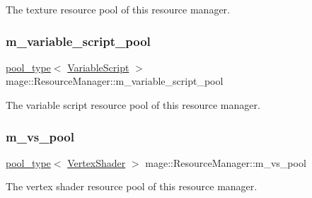 The texture resource pool of this resource manager. \hypertarget{classmage_1_1_resource_manager_a8f1826ab2392b60265afe5ba1ef2c4ed}{}\label{classmage_1_1_resource_manager_a8f1826ab2392b60265afe5ba1ef2c4ed} 
\subsubsection{\texorpdfstring{m\+\_\+variable\+\_\+script\+\_\+pool}{m\_variable\_script\_pool}}
{\footnotesize\ttfamily \hyperlink{classmage_1_1_resource_manager_a4416f0a710790d8aa2d0bc006764695a}{pool\+\_\+type}$<$ \hyperlink{classmage_1_1_variable_script}{Variable\+Script} $>$ mage\+::\+Resource\+Manager\+::m\+\_\+variable\+\_\+script\+\_\+pool\hspace{0.3cm}{\ttfamily [private]}}

The variable script resource pool of this resource manager. \hypertarget{classmage_1_1_resource_manager_ab8751a95e77af4000106e02bf8b4f8cb}{}\label{classmage_1_1_resource_manager_ab8751a95e77af4000106e02bf8b4f8cb} 
\subsubsection{\texorpdfstring{m\+\_\+vs\+\_\+pool}{m\_vs\_pool}}
{\footnotesize\ttfamily \hyperlink{classmage_1_1_resource_manager_a4416f0a710790d8aa2d0bc006764695a}{pool\+\_\+type}$<$ \hyperlink{classmage_1_1_vertex_shader}{Vertex\+Shader} $>$ mage\+::\+Resource\+Manager\+::m\+\_\+vs\+\_\+pool\hspace{0.3cm}{\ttfamily [private]}}

The vertex shader resource pool of this resource manager. 